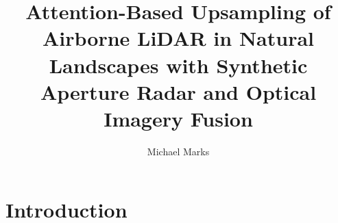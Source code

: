\documentclass[preprint,12pt,authoryear]{elsarticle}
\begin{document}
\begin{frontmatter}

\title{Attention-Based Upsampling of Airborne LiDAR in Natural Landscapes with Synthetic Aperture Radar and Optical Imagery Fusion}

\author[affil]{Michael Marks}





\end{frontmatter}





\section{Introduction}
\end{document}
